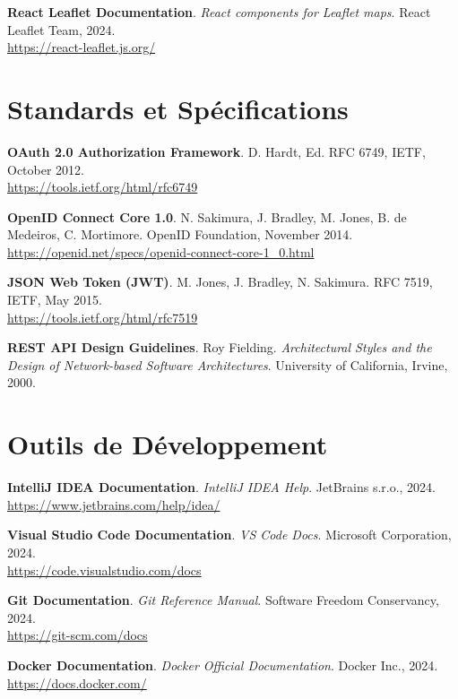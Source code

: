 \noindent [10] \textbf{React Leaflet Documentation}. \textit{React components for Leaflet maps}. React Leaflet Team, 2024. \\
\url{https://react-leaflet.js.org/}

\section*{Standards et Spécifications}

\noindent [11] \textbf{OAuth 2.0 Authorization Framework}. D. Hardt, Ed. RFC 6749, IETF, October 2012. \\
\url{https://tools.ietf.org/html/rfc6749}

\noindent [12] \textbf{OpenID Connect Core 1.0}. N. Sakimura, J. Bradley, M. Jones, B. de Medeiros, C. Mortimore. OpenID Foundation, November 2014. \\
\url{https://openid.net/specs/openid-connect-core-1_0.html}

\noindent [13] \textbf{JSON Web Token (JWT)}. M. Jones, J. Bradley, N. Sakimura. RFC 7519, IETF, May 2015. \\
\url{https://tools.ietf.org/html/rfc7519}

\noindent [14] \textbf{REST API Design Guidelines}. Roy Fielding. \textit{Architectural Styles and the Design of Network-based Software Architectures}. University of California, Irvine, 2000.

\section*{Outils de Développement}

\noindent [15] \textbf{IntelliJ IDEA Documentation}. \textit{IntelliJ IDEA Help}. JetBrains s.r.o., 2024. \\
\url{https://www.jetbrains.com/help/idea/}

\noindent [16] \textbf{Visual Studio Code Documentation}. \textit{VS Code Docs}. Microsoft Corporation, 2024. \\
\url{https://code.visualstudio.com/docs}

\noindent [17] \textbf{Git Documentation}. \textit{Git Reference Manual}. Software Freedom Conservancy, 2024. \\
\url{https://git-scm.com/docs}

\noindent [18] \textbf{Docker Documentation}. \textit{Docker Official Documentation}. Docker Inc., 2024. \\
\url{https://docs.docker.com/}

